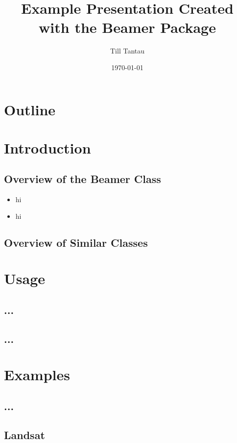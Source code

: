 \documentclass[pdflatex,compress,8pt,
	xcolor={dvipsnames,dvipsnames,svgnames,x11names,table},
	hyperref={colorlinks = true,breaklinks = true, urlcolor = NavyBlue, breaklinks = true}]{beamer}
\title{Example Presentation Created with the Beamer Package}
\author{Till Tantau}
\date{\today}
\begin{document}
\begin{frame}
           \titlepage
\end{frame}

\section*{Outline}
        \begin{frame}
           \tableofcontents
         \end{frame}

\section{Introduction}
         \subsection{Overview of the Beamer Class}
\begin{itemize}
	\item hi
	\item hi
\end{itemize}
         \subsection{Overview of Similar Classes}

\section{Usage} \subsection{...} \subsection{...}

\section{Examples} \subsection{...}

\subsection{Landsat}
         \begin{frame}
         \end{frame} %
\end{document}
